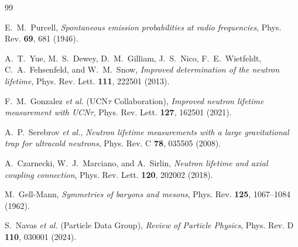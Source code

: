 \documentclass[11pt,a4paper]{article}
\theoremstyle{definition}
\theoremstyle{remark}
\begin{document}
\begin{thebibliography}{99}

E.~M.~Purcell, \textit{Spontaneous emission probabilities at radio frequencies}, Phys. Rev. \textbf{69}, 681 (1946).

A.~T.~Yue, M.~S.~Dewey, D.~M.~Gilliam, J.~S.~Nico, F.~E.~Wietfeldt, C.~A.~Fehsenfeld, and W.~M.~Snow, \textit{Improved determination of the neutron lifetime}, Phys. Rev. Lett. \textbf{111}, 222501 (2013).

F.~M.~Gonzalez \textit{et al.} (UCN$\tau$ Collaboration), \textit{Improved neutron lifetime measurement with UCN$\tau$}, Phys. Rev. Lett. \textbf{127}, 162501 (2021).

A.~P.~Serebrov \textit{et al.}, \textit{Neutron lifetime measurements with a large gravitational trap for ultracold neutrons}, Phys. Rev. C \textbf{78}, 035505 (2008).

A.~Czarnecki, W.~J.~Marciano, and A.~Sirlin, \textit{Neutron lifetime and axial coupling connection}, Phys. Rev. Lett. \textbf{120}, 202002 (2018).

M.~Gell-Mann, \textit{Symmetries of baryons and mesons}, Phys. Rev. \textbf{125}, 1067--1084 (1962).

S.~Navas \textit{et al.} (Particle Data Group), \textit{Review of Particle Physics}, Phys. Rev. D \textbf{110}, 030001 (2024).

\end{thebibliography}
\end{document}
